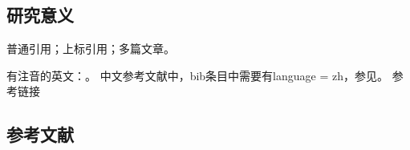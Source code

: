 
\subsection{研究意义}
\vspace{-5pt}

普通引用\cite{test}；上标引用；多篇文章。

有注音的英文：\cite{test}。
中文参考文献中，bib条目中需要有language = {zh}，参见\cite{test2}。
参考链接\cite{test4}

\begin{REF}
\subsection*{参考文献}
\vspace{-50pt}

\end{REF}

